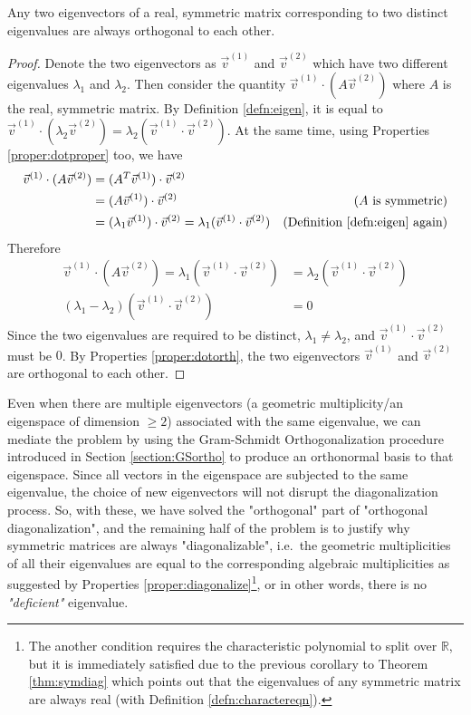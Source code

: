 \begin{proper}
\label{proper:symortho}
Any two eigenvectors of a real, symmetric matrix corresponding to two distinct eigenvalues are always orthogonal to each other.
\end{proper}
\begin{proof}
Denote the two eigenvectors as $\vec{v}^{(1)}$ and $\vec{v}^{(2)}$ which have two different eigenvalues $\lambda_1$ and $\lambda_2$. Then consider the quantity $\vec{v}^{(1)} \cdot (A\vec{v}^{(2)})$ where $A$ is the real, symmetric matrix. By Definition \ref{defn:eigen}, it is equal to $\vec{v}^{(1)} \cdot (\lambda_{2}\vec{v}^{(2)}) = \lambda_{2}(\vec{v}^{(1)} \cdot \vec{v}^{(2)})$. At the same time, using Properties \ref{proper:dotproper} too, we have
\begin{align*}
\vec{v}^{(1)}\cdot (A\vec{v}^{(2)}) &= (A^T\vec{v}^{(1)})\cdot \vec{v}^{(2)} \\
&= (A\vec{v}^{(1)})\cdot \vec{v}^{(2)} &\text{($A$ is symmetric)} \\
&= (\lambda_1\vec{v}^{(1)})\cdot \vec{v}^{(2)} = \lambda_1(\vec{v}^{(1)} \cdot \vec{v}^{(2)}) &\text{(Definition \ref{defn:eigen} again)}
\end{align*}
Therefore
\begin{align*}
\vec{v}^{(1)} \cdot (A\vec{v}^{(2)}) =  \lambda_1(\vec{v}^{(1)} \cdot \vec{v}^{(2)}) &= \lambda_{2}(\vec{v}^{(1)}\cdot \vec{v}^{(2)}) \\
(\lambda_{1}-\lambda_{2})(\vec{v}^{(1)} \cdot \vec{v}^{(2)}) &= 0
\end{align*}
Since the two eigenvalues are required to be distinct, $\lambda_{1} \neq \lambda_{2}$, and $\vec{v}^{(1)} \cdot \vec{v}^{(2)}$ must be $0$. By Properties \ref{proper:dotorth}, the two eigenvectors $\vec{v}^{(1)}$ and $\vec{v}^{(2)}$ are orthogonal to each other.
\end{proof}
Even when there are multiple eigenvectors (a geometric multiplicity/an eigenspace of dimension $\geq 2$) associated with the same eigenvalue, we can mediate the problem by using the Gram-Schmidt Orthogonalization procedure introduced in Section \ref{section:GSortho} to produce an orthonormal basis to that eigenspace. Since all vectors in the eigenspace are subjected to the same eigenvalue, the choice of new eigenvectors will not disrupt the diagonalization process. So, with these, we have solved the "orthogonal" part of "orthogonal diagonalization", and the remaining half of the problem is to justify why symmetric matrices are always "diagonalizable", i.e.\ the geometric multiplicities of all their eigenvalues are equal to the corresponding algebraic multiplicities as suggested by Properties \ref{proper:diagonalize}\footnote{The another condition requires the characteristic polynomial to split over $\mathbb{R}$, but it is immediately satisfied due to the previous corollary to Theorem \ref{thm:symdiag} which points out that the eigenvalues of any symmetric matrix are always real (with Definition \ref{defn:charactereqn}).}, or in other words, there is no \textit{"deficient"} eigenvalue.
